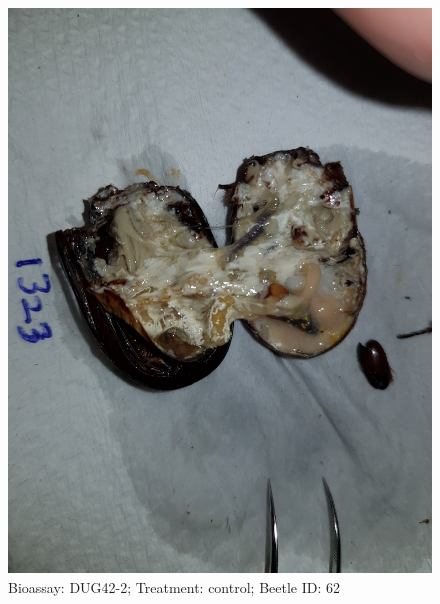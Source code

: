 \documentclass[11pt]{scrartcl}
\begin{document}
\begin{figure}[h!]
    \centering
    \includegraphics[width=\linewidth, height=\textheight, keepaspectratio]{uploads/btl.pm_image.adc7457e72c06e1f.447567343220313332335f5265702d3220636f6e74726f6c2e6a7067.jpg}
    \caption{Bioassay: DUG42-2; Treatment: control; Beetle ID: 62}
\end{figure}
\clearpage
\end{document}
